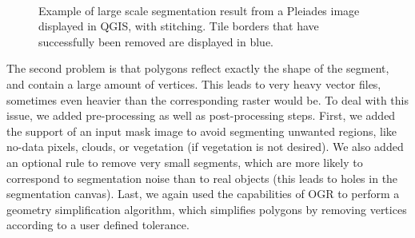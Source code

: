 \documentclass{josis}
\begin{document}
\begin{figure}[!htb]
\centering
{}\\
\caption{Example of large scale segmentation result from a Pleiades
  image displayed in QGIS, with stitching. Tile borders that have
  successfully been removed are displayed in blue.}\label{fig:stitch}
\end{figure}

The second problem is that polygons reflect exactly the shape of the
segment, and contain a large amount of vertices. This leads to very
heavy vector files, sometimes even heavier than the corresponding
raster would be. To deal with this issue, we added pre-processing as
well as post-processing steps. First, we added the support of an input
mask image to avoid segmenting unwanted regions, like no-data pixels,
clouds, or vegetation (if vegetation is not desired). We also added an
optional rule to remove very small segments, which are more likely to
correspond to segmentation noise than to real objects (this leads to
holes in the segmentation canvas). Last, we again used the
capabilities of OGR to perform a geometry simplification algorithm,
which simplifies polygons by removing vertices according to a user
defined tolerance.
\end{document}
